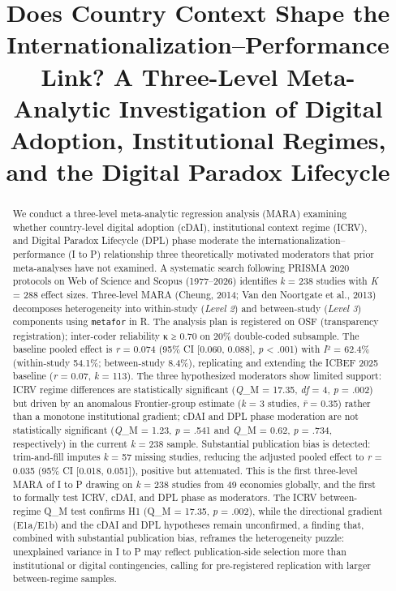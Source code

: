 \documentclass[
  12pt,a4paper]{article}
\title{Does Country Context Shape the Internationalization--Performance
Link? A Three-Level Meta-Analytic Investigation of Digital Adoption,
Institutional Regimes, and the Digital Paradox Lifecycle}
\author{}
\date{}
\begin{document}
\maketitle
\begin{abstract}
We conduct a three-level meta-analytic regression analysis (MARA)
examining whether country-level digital adoption (cDAI), institutional
context regime (ICRV), and Digital Paradox Lifecycle (DPL) phase
moderate the internationalization--performance (I to P) relationship
three theoretically motivated moderators that prior meta-analyses have
not examined. A systematic search following PRISMA 2020 protocols on Web
of Science and Scopus (1977--2026) identifies \emph{k} = 238 studies
with \emph{K} = 288 effect sizes. Three-level MARA (Cheung, 2014; Van
den Noortgate et al., 2013) decomposes heterogeneity into within-study
(\emph{Level 2}) and between-study (\emph{Level 3}) components using
\texttt{metafor} in R. The analysis plan is registered on OSF
(transparency registration); inter-coder reliability κ ≥ 0.70 on 20\%
double-coded subsample. The baseline pooled effect is \emph{r} = 0.074
(95\% CI {[}0.060, 0.088{]}, \emph{p} \textless{} .001) with \emph{I}² =
62.4\% (within-study 54.1\%; between-study 8.4\%), replicating and
extending the ICBEF 2025 baseline (\emph{r} = 0.07, \emph{k} = 113). The
three hypothesized moderators show limited support: ICRV regime
differences are statistically significant (\emph{Q}\_M = 17.35,
\emph{df} = 4, \emph{p} = .002) but driven by an anomalous
Frontier-group estimate (\emph{k} = 3 studies, \emph{r̄} = 0.35) rather
than a monotone institutional gradient; cDAI and DPL phase moderation
are not statistically significant (\emph{Q}\_M = 1.23, \emph{p} = .541
and \emph{Q}\_M = 0.62, \emph{p} = .734, respectively) in the current
\emph{k} = 238 sample. Substantial publication bias is detected:
trim-and-fill imputes \emph{k} = 57 missing studies, reducing the
adjusted pooled effect to \emph{r} = 0.035 (95\% CI {[}0.018, 0.051{]}),
positive but attenuated. This is the first three-level MARA of I to P
drawing on \emph{k} = 238 studies from 49 economies globally, and the
first to formally test ICRV, cDAI, and DPL phase as moderators. The ICRV
between-regime Q\_M test confirms H1 (Q\_M = 17.35, \emph{p} = .002),
while the directional gradient (E1a/E1b) and the cDAI and DPL hypotheses
remain unconfirmed, a finding that, combined with substantial
publication bias, reframes the heterogeneity puzzle: unexplained
variance in I to P may reflect publication-side selection more than
institutional or digital contingencies, calling for pre-registered
replication with larger between-regime samples.
\end{abstract}
\end{document}
